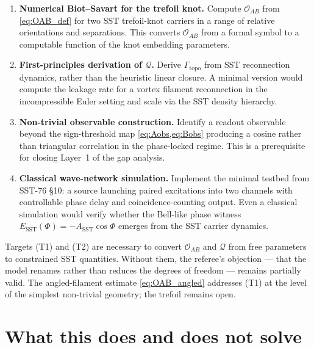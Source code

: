 \documentclass[11pt]{article}
\begin{document}
\begin{enumerate}[label=(T\arabic*)]
    \item \textbf{Numerical Biot--Savart for the trefoil knot.} Compute $\mathcal{O}_{AB}$ from \cref{eq:OAB_def} for two SST trefoil-knot carriers in a range of relative orientations and separations. This converts $\mathcal{O}_{AB}$ from a formal symbol to a computable function of the knot embedding parameters.

    \item \textbf{First-principles derivation of $\mathcal{Q}$.} Derive $\Gamma_{\mathrm{topo}}$ from SST reconnection dynamics, rather than the heuristic linear closure. A minimal version would compute the leakage rate for a vortex filament reconnection in the incompressible Euler setting and scale via the SST density hierarchy.

    \item \textbf{Non-trivial observable construction.} Identify a readout observable beyond the sign-threshold map \cref{eq:Aobs,eq:Bobs} producing a cosine rather than triangular correlation in the phase-locked regime. This is a prerequisite for closing Layer~1 of the gap analysis.

    \item \textbf{Classical wave-network simulation.} Implement the minimal testbed from SST-76 §10: a source launching paired excitations into two channels with controllable phase delay and coincidence-counting output. Even a classical simulation would verify whether the Bell-like phase witness $E_{\mathrm{SST}}(\Phi) = -A_{\mathrm{SST}}\cos\Phi$ emerges from the SST carrier dynamics.
\end{enumerate}

Targets (T1) and (T2) are necessary to convert $\mathcal{O}_{AB}$ and $\mathcal{Q}$ from free parameters to constrained SST quantities. Without them, the referee's objection — that the model renames rather than reduces the degrees of freedom — remains partially valid. The angled-filament estimate \cref{eq:OAB_angled} addresses (T1) at the level of the simplest non-trivial geometry; the trefoil remains open.

\section{What this does and does not solve}
\end{document}
